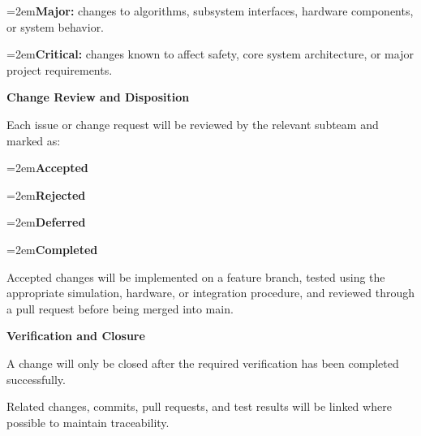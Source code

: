 \documentclass[12pt,a4paper]{article}
\begin{document}
\par\noindent\hangindent=2em\hspace*{1em}\textbullet\hspace{0.5em}\textbf{Major:} changes to algorithms, subsystem interfaces, hardware components, or system behavior.\par
\par\noindent\hangindent=2em\hspace*{1em}\textbullet\hspace{0.5em}\textbf{Critical:} changes known to affect safety, core system architecture, or major project requirements.\par
\par\medskip\noindent\textbf{Change Review and Disposition}\par\smallskip
\noindent Each issue or change request will be reviewed by the relevant subteam and marked as:\par
\par\noindent\hangindent=2em\hspace*{1em}\textbullet\hspace{0.5em}\textbf{Accepted}\par
\par\noindent\hangindent=2em\hspace*{1em}\textbullet\hspace{0.5em}\textbf{Rejected}\par
\par\noindent\hangindent=2em\hspace*{1em}\textbullet\hspace{0.5em}\textbf{Deferred}\par
\par\noindent\hangindent=2em\hspace*{1em}\textbullet\hspace{0.5em}\textbf{Completed}\par
\noindent Accepted changes will be implemented on a feature branch, tested using the appropriate simulation, hardware, or integration procedure, and reviewed through a pull request before being merged into main.\par
\par\medskip\noindent\textbf{Verification and Closure}\par\smallskip
\noindent A change will only be closed after the required verification has been completed successfully.\par
\noindent Related changes, commits, pull requests, and test results will be linked where possible to maintain traceability.\par
\end{document}
